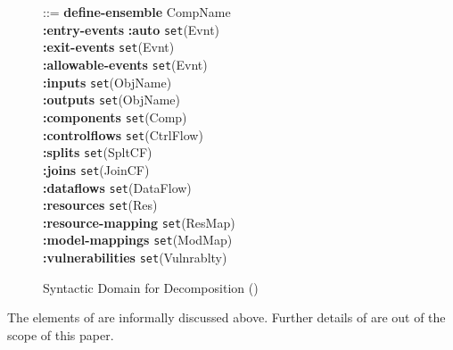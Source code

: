 \documentclass[conference]{IEEEtran}
\begin{document}
\begin{figure}[ht]
\begin{tabbing}
 ::= \textbf{define-}\=\textbf{ensemble} CompName
\\\> \textbf{:entry-events} \hspace*{1cm} \textbf{:auto}  \texttt{set}(Evnt)
\\\> \textbf{:exit-events} \hspace*{1.3cm} \texttt{set}(Evnt)
\\\> \textbf{:allowable-events} \hspace*{0.4cm} \texttt{set}(Evnt)
\\\> \textbf{:inputs} \hspace*{1.95cm} \texttt{set}(ObjName)
\\\> \textbf{:outputs} \hspace*{1.75cm} \texttt{set}(ObjName)
\\\> \textbf{:components} \hspace*{1.1cm} \texttt{set}(Comp)
\\\> \textbf{:controlflows} \hspace*{1.05cm} \texttt{set}(CtrlFlow)
\\\> \textbf{:splits} \hspace*{2.1cm} \texttt{set}(SpltCF)
\\\> \textbf{:joins} \hspace*{2.15cm} \texttt{set}(JoinCF)
\\\> \textbf{:dataflows} \hspace*{1.5cm} \texttt{set}(DataFlow)
\\\> \textbf{:resources} \hspace*{1.55cm} \texttt{set}(Res)
\\\> \textbf{:resource-mapping} \hspace*{0.25cm} \texttt{set}(ResMap)
\\\> \textbf{:model-mappings} \hspace*{0.5cm} \texttt{set}(ModMap)
\\\> \textbf{:vulnerabilities} \hspace*{0.8cm} \texttt{set}(Vulnrablty)
\end{tabbing}
\caption{Syntactic Domain for Decomposition ()}
\label{fig:decomp}
\end{figure}
The elements of  are informally discussed above. Further details of  are out of the scope of this paper.
\end{document}
